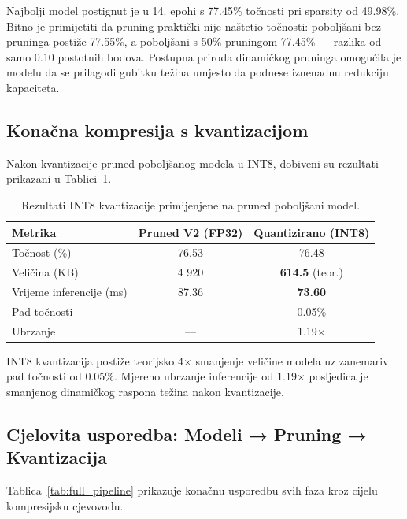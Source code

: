 \documentclass[letterpaper, 10 pt, conference]{ieeeconf}
\begin{document}
Najbolji model postignut je u 14. epohi s 77.45\% točnosti pri sparsity od 49.98\%.
Bitno je primijetiti da pruning praktički nije naštetio točnosti: poboljšani bez pruninga postiže 77.55\%, a poboljšani s 50\% pruningom 77.45\% --- razlika od samo 0.10 postotnih bodova.
Postupna priroda dinamičkog pruninga omogućila je modelu da se prilagodi gubitku težina umjesto da podnese iznenadnu redukciju kapaciteta.

\subsection{Konačna kompresija s kvantizacijom}

Nakon kvantizacije pruned poboljšanog modela u INT8, dobiveni su rezultati prikazani u Tablici~\ref{tab:quant}.

\begin{table}[h]
\caption{Rezultati INT8 kvantizacije primijenjene na pruned poboljšani model.}
\label{tab:quant}
\begin{center}
\begin{tabular}{lcc}
\toprule
\textbf{Metrika} & \textbf{Pruned V2 (FP32)} & \textbf{Quantizirano (INT8)} \\
\midrule
Točnost (\%)         & 76.53 & 76.48 \\
Veličina (KB)         & 4 920 & \textbf{614.5} (teor.) \\
Vrijeme inferencije (ms) & 87.36 & \textbf{73.60} \\
\midrule
Pad točnosti          & --- & 0.05\% \\
Ubrzanje              & --- & 1.19$\times$ \\
\bottomrule
\end{tabular}
\end{center}
\end{table}

INT8 kvantizacija postiže teorijsko 4$\times$ smanjenje veličine modela uz zanemariv pad točnosti od 0.05\%.
Mjereno ubrzanje inferencije od 1.19$\times$ posljedica je smanjenog dinamičkog raspona težina nakon kvantizacije.

\subsection{Cjelovita usporedba: Modeli → Pruning → Kvantizacija}

Tablica~\ref{tab:full_pipeline} prikazuje konačnu usporedbu svih faza kroz cijelu kompresijsku cjevovodu.
\end{document}
